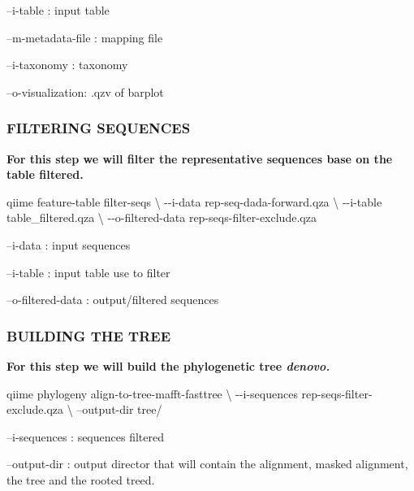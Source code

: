 \documentclass[]{interact}
\theoremstyle{plain}%
\theoremstyle{definition}
\theoremstyle{remark}
\newenvironment{Shaded}{\begin{snugshade}}{\end{snugshade}}
\newcommand{\DataTypeTok}[1]{\textcolor[rgb]{0.13,0.29,0.53}{#1}}
\newcommand{\ExtensionTok}[1]{#1}
\newcommand{\NormalTok}[1]{#1}
\begin{document}
--i-table : input table

--m-metadata-file : mapping file

--i-taxonomy : taxonomy

--o-visualization: .qzv of barplot

\hypertarget{filtering-sequences}{%
\subsubsection{FILTERING SEQUENCES}\label{filtering-sequences}}

\textbf{For this step we will filter the representative sequences base
on the table filtered.}

\begin{Shaded}
\begin{Highlighting}[]
\ExtensionTok{qiime}\NormalTok{ feature{-}table filter{-}seqs }\DataTypeTok{\textbackslash{}}
\NormalTok{{-}{-}i{-}data rep{-}seq{-}dada{-}forward.qza }\DataTypeTok{\textbackslash{}}
\NormalTok{{-}{-}i{-}table table\_filtered.qza }\DataTypeTok{\textbackslash{}}
\NormalTok{{-}{-}o{-}filtered{-}data rep{-}seqs{-}filter{-}exclude.qza }
\end{Highlighting}
\end{Shaded}

--i-data : input sequences

--i-table : input table use to filter

--o-filtered-data : output/filtered sequences

\hypertarget{building-the-tree}{%
\subsubsection{BUILDING THE TREE}\label{building-the-tree}}

\textbf{For this step we will build the phylogenetic tree
\emph{denovo.}}

\begin{Shaded}
\begin{Highlighting}[]
\ExtensionTok{qiime}\NormalTok{ phylogeny align{-}to{-}tree{-}mafft{-}fasttree }\DataTypeTok{\textbackslash{}}
\NormalTok{{-}{-}i{-}sequences rep{-}seqs{-}filter{-}exclude.qza }\DataTypeTok{\textbackslash{}}
\NormalTok{–output{-}dir tree/}
\end{Highlighting}
\end{Shaded}

--i-sequences : sequences filtered

--output-dir : output director that will contain the alignment, masked
alignment, the tree and the rooted treed.
\end{document}
